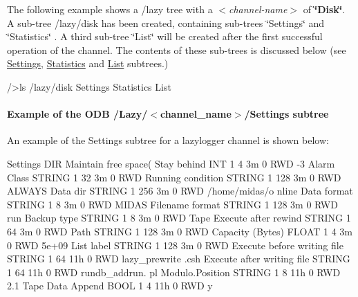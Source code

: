 The following example shows a /lazy tree with a {\itshape  $<$channel-\/name$>$ \/} of {\bfseries \char`\"{}Disk\char`\"{}}. A sub-\/tree /lazy/disk has been created, containing sub-\/trees \char`\"{}Settings\char`\"{} and \char`\"{}Statistics\char`\"{} . A third sub-\/tree \char`\"{}List\char`\"{} will be created after the first successful operation of the channel. The contents of these sub-\/trees is discussed below (see \hyperlink{F_LogUtil_F_ODB_Lazy_Settings}{Settings}, \hyperlink{F_LogUtil_F_ODB_Lazy_Statistics}{Statistics} and \hyperlink{F_LogUtil_F_ODB_Lazy_List}{List} subtrees.) 
\begin{DoxyCode}
/>ls /lazy/disk
Settings
Statistics
List
\end{DoxyCode}


\par


\par
 \hypertarget{F_LogUtil_F_ODB_Lazy_Settings_example}{}\paragraph{Example of the  ODB /Lazy/$<$channel\_\-name$>$/Settings subtree}\label{F_LogUtil_F_ODB_Lazy_Settings_example}
An example of the Settings subtree for a lazylogger channel is shown below:


\begin{DoxyCode}
    Settings                      DIR
        Maintain free space(%
        Stay behind               INT     1     4     3m   0   RWD  -3
        Alarm Class               STRING  1     32    3m   0   RWD  
        Running condition         STRING  1     128   3m   0   RWD  ALWAYS
        Data dir                  STRING  1     256   3m   0   RWD  /home/midas/o
      nline
        Data format               STRING  1     8     3m   0   RWD  MIDAS
        Filename format           STRING  1     128   3m   0   RWD  run%
        Backup type               STRING  1     8     3m   0   RWD  Tape
        Execute after rewind      STRING  1     64    3m   0   RWD  
        Path                      STRING  1     128   3m   0   RWD  
        Capacity (Bytes)          FLOAT   1     4     3m   0   RWD  5e+09
        List label                STRING  1     128   3m   0   RWD  
  Execute before writing file     STRING  1     64    11h  0   RWD  lazy_prewrite
      .csh
  Execute after writing file      STRING  1     64    11h  0   RWD  rundb_addrun.
      pl
  Modulo.Position                 STRING  1     8     11h  0   RWD  2.1
  Tape Data Append                BOOL    1     4     11h  0   RWD  y
\end{DoxyCode}


